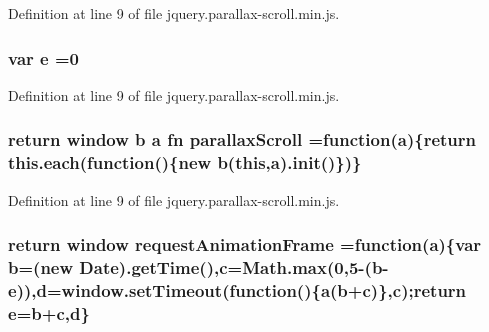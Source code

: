 Definition at line 9 of file jquery.\+parallax-\/scroll.\+min.\+js.

\subsubsection[{\texorpdfstring{e}{e}}]{\setlength{\rightskip}{0pt plus 5cm}var e =0}\hypertarget{jquery_8parallax-scroll_8min_8js_ab5902775854a8b8440bcd25e0fe1c120}{}\label{jquery_8parallax-scroll_8min_8js_ab5902775854a8b8440bcd25e0fe1c120}


Definition at line 9 of file jquery.\+parallax-\/scroll.\+min.\+js.

\subsubsection[{\texorpdfstring{parallax\+Scroll}{parallaxScroll}}]{\setlength{\rightskip}{0pt plus 5cm}return {\bf window} {\bf b} {\bf a} {\bf fn} parallax\+Scroll =function({\bf a})\{return {\bf this.\+each}(function()\{new {\bf b}({\bf this},{\bf a}).{\bf init}()\})\}}\hypertarget{jquery_8parallax-scroll_8min_8js_a748992b9ddf92867168bb25fbce943ba}{}\label{jquery_8parallax-scroll_8min_8js_a748992b9ddf92867168bb25fbce943ba}


Definition at line 9 of file jquery.\+parallax-\/scroll.\+min.\+js.

\subsubsection[{\texorpdfstring{request\+Animation\+Frame}{requestAnimationFrame}}]{\setlength{\rightskip}{0pt plus 5cm}return {\bf window} request\+Animation\+Frame =function({\bf a})\{var {\bf b}=(new Date).get\+Time(),{\bf c}={\bf Math.\+max}(0,5-\/({\bf b}-\/{\bf e})),{\bf d}=window.\+set\+Timeout(function()\{{\bf a}({\bf b}+{\bf c})\},{\bf c});return {\bf e}={\bf b}+{\bf c},{\bf d}\}}\hypertarget{jquery_8parallax-scroll_8min_8js_a6354438e9c7ce6b4b9dbdd2c9727f4a5}{}\label{jquery_8parallax-scroll_8min_8js_a6354438e9c7ce6b4b9dbdd2c9727f4a5}


